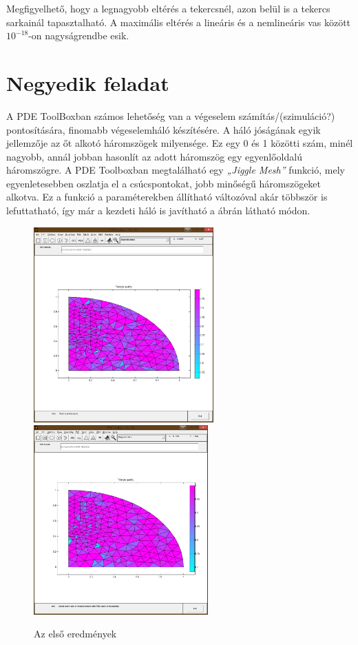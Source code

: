 Megfigyelhető, hogy a legnagyobb eltérés a tekercsnél, azon belül is a tekercs sarkainál tapasztalható. A maximális eltérés a lineáris és a nemlineáris vas között $ 10^{-18} $-on nagyságrendbe esik.




\section{Negyedik feladat}

A PDE ToolBoxban számos lehetőség van a végeselem számítás/(szimuláció?) pontosítására, finomabb végeselemháló készítésére. A háló jóságának egyik jellemzője az őt alkotó háromszögek milyensége. Ez egy 0 és 1 közötti szám, minél nagyobb, annál jobban hasonlít az adott háromszög egy egyenlőoldalú háromszögre. A PDE Toolboxban megtalálható egy \textit{„Jiggle Mesh”} funkció, mely egyenletesebben oszlatja el a csúcspontokat, jobb minőségű háromszögeket alkotva. Ez a funkció a paraméterekben állítható változóval akár többször is lefuttatható, így már a kezdeti háló is javítható a  ábrán látható módon.
\begin{figure}[!h]
	\centering
	\includegraphics[trim = 25mm 50mm 10mm 70mm,clip, width=69mm, keepaspectratio]{figures/terek/nl_1_3szog0.png}\hspace{5mm}
	\includegraphics[trim = 25mm 50mm 10mm 70mm,clip, width=67mm, keepaspectratio]{figures/terek/nl_1_3szog1.png}
	\caption{Az első eredmények}
	\label{fig:jiggle}
\end{figure}

